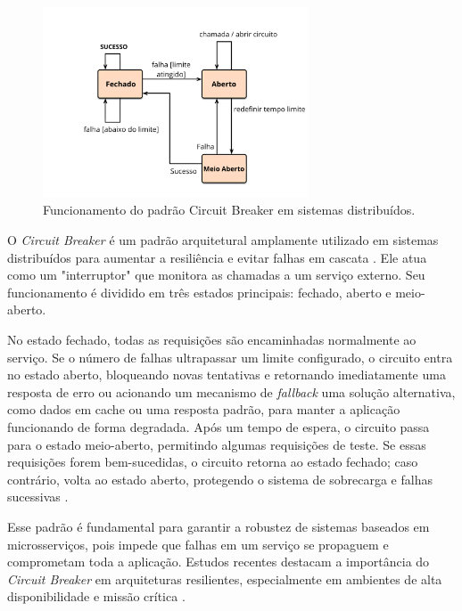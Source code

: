 \begin{figure}[H]
\centering
\includegraphics[width=0.7\textwidth]{./images/circuit_breaker.png}
\caption{Funcionamento do padrão Circuit Breaker em sistemas distribuídos.}
\label{fig:circuit-breaker}
\end{figure}

O \textit{Circuit Breaker} é um padrão arquitetural amplamente utilizado em sistemas distribuídos para aumentar a resiliência e evitar falhas em cascata \cite{Nair2019CircuitBreaker, Fowler2012CircuitBreaker}. Ele atua como um "interruptor" que monitora as chamadas a um serviço externo. Seu funcionamento é dividido em três estados principais: fechado, aberto e meio-aberto.

No estado fechado, todas as requisições são encaminhadas normalmente ao serviço. Se o número de falhas ultrapassar um limite configurado, o circuito entra no estado aberto, bloqueando novas tentativas e retornando imediatamente uma resposta de erro ou acionando um mecanismo de \textit{fallback} uma solução alternativa, como dados em cache ou uma resposta padrão, para manter a aplicação funcionando de forma degradada. Após um tempo de espera, o circuito passa para o estado meio-aberto, permitindo algumas requisições de teste. Se essas requisições forem bem-sucedidas, o circuito retorna ao estado fechado; caso contrário, volta ao estado aberto, protegendo o sistema de sobrecarga e falhas sucessivas \cite{Nair2019CircuitBreaker, Fowler2012CircuitBreaker}.

Esse padrão é fundamental para garantir a robustez de sistemas baseados em microsserviços, pois impede que falhas em um serviço se propaguem e comprometam toda a aplicação. Estudos recentes destacam a importância do \textit{Circuit Breaker} em arquiteturas resilientes, especialmente em ambientes de alta disponibilidade e missão crítica \cite{Nair2019CircuitBreaker}. 

